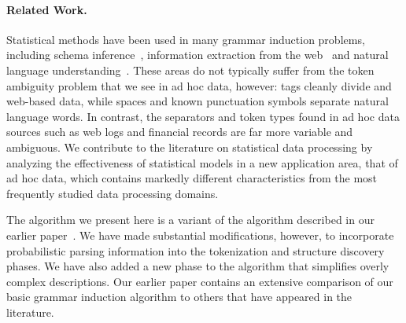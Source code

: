 \paragraph*{Related Work.}
Statistical methods have been used in many grammar induction problems,
including 
\xml{} schema inference~\cite{bex+:dtd-inference}, 
information extraction from the web~\cite{hong:thesis,arasu+:sigmod03long}  
and 
natural language understanding~\cite{Chen95bayesiangrammar}.
These areas do not typically suffer from the
token ambiguity problem that we see in ad hoc data, however:  
tags cleanly divide 
\xml{} and web-based data, while spaces and known punctuation symbols
separate natural language words.
In contrast,
the separators and token types found in ad hoc data sources such as
web logs and financial records are far more variable and 
ambiguous.  We contribute to the literature on statistical 
data processing by analyzing the effectiveness of statistical models
in a new application area, that of ad hoc data, which contains 
markedly different characteristics from the most frequently studied
data processing domains.

The algorithm we present here is a variant of the algorithm described
in our earlier paper~\cite{fisher+:dirttoshovels}.  We have made
substantial modifications, however, to incorporate probabilistic
parsing information into the tokenization and structure discovery
phases.  We have also added a new phase to the algorithm that
simplifies overly complex descriptions.  Our earlier paper contains an
extensive comparison of our basic grammar induction
algorithm to others that have appeared in the literature.


